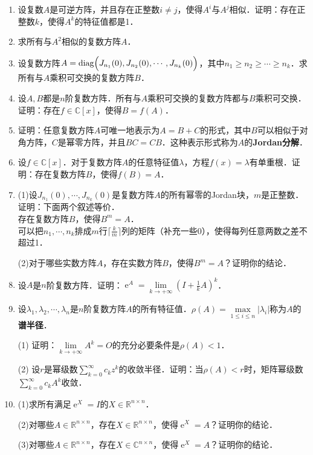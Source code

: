 \documentclass[a4paper,fontset=windows]{ctexbook}
\theoremstyle{definition}
\DeclareMathOperator{\diag}{diag}
\DeclareMathOperator{\E}{e}
\renewcommand{\le}{\leqslant}
\renewcommand{\ge}{\geqslant}
\begin{document}
\begin{enumerate}
\item 设复数$A$是可逆方阵，并且存在正整数$i\ne j$，使得$A^i$与$A^j$相似．证明：存在正整数$k$，使得$A^k$的特征值都是1．

\item 求所有与$A^2$相似的复数方阵$A$．

\item 设复数方阵$A=\diag\Bigl(J_{n_1}(0),J_{n_2}(0),\cdots,J_{n_k}(0)\Bigr)$，其中$n_1\ge n_2\ge\cdots\ge n_k$．求所有与$A$乘积可交换的复数方阵$B$．

\item 设$A,B$都是$n$阶复数方阵．所有与$A$乘积可交换的复数方阵都与$B$乘积可交换．证明：存在$f\in\mathbb{C}[x]$，使得$B=f(A)$．

\item 证明：任意复数方阵$A$可唯一地表示为$A=B+C$的形式，其中$B$可以相似于对角方阵，$C$是幂零方阵，并且$BC=CB$．这种表示形式称为$A$的{\bf Jordan分解}．

\item 设$f\in\mathbb{C}[x]$．对于复数方阵$A$的任意特征值$\lambda$，方程$f(x)=\lambda$有单重根．证明：存在复数方阵$B$，使得$f(B)=A$．

\item (1)设$J_{n_1}(0),\cdots,J_{n_k}(0)$是复数方阵$A$的所有幂零的Jordan块，$m$是正整数．证明：下面两个叙述等价．\\
\hspace*{17pt} 存在复数方阵$B$，使得$B^m=A$．\\
\hspace*{17pt} 可以把$n_1,\cdots,n_k$排成$m$行$\lceil\frac{k}{m}\rceil$列的矩阵（补充一些0），使得每列任意两数之差不超过1．

(2)对于哪些实数方阵$A$，存在实数方阵$B$，使得$B^m=A$？证明你的结论．

\item 设$A$是$n$阶复数方阵．证明：$\E^A=\lim\limits_{k\to+\infty}(I+\frac{1}{k}A)^k$．

\item 设$\lambda_1,\lambda_2,\cdots,\lambda_n$是$n$阶复数方阵$A$的所有特征值．$\rho(A)=\max\limits_{1\le i\le n}|\lambda_i|$称为$A$的{\bf 谱半径}．

(1) 证明：$\lim\limits_{k\to+\infty}A^k=O$的充分必要条件是$\rho(A)<1$．

(2) 设$r$是幂级数$\sum\limits_{k=0}^\infty c_kz^k$的收敛半径．证明：当$\rho(A)<r$时，矩阵幂级数$\sum\limits_{k=0}^\infty c_kA^k$收敛．

\item (1)求所有满足$\E^X=I$的$X\in\mathbb{R}^{n\times n}$．

(2)对哪些$A\in\mathbb{R}^{n\times n}$，存在$X\in\mathbb{R}^{n\times n}$，使得$\E^X=A$？证明你的结论．

(3)对哪些$A\in\mathbb{R}^{n\times n}$，存在$X\in\mathbb{C}^{n\times n}$，使得$\E^X=A$？证明你的结论．

\end{enumerate}
\end{document}

